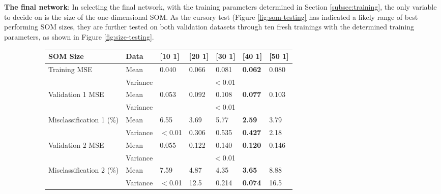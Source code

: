 \documentclass[10pt, oneside]{article}
\begin{document}
\textbf{The final network}: In selecting the final network, with the training parameters determined in Section \ref{subsec:training}, the only variable to decide on is the size of the one-dimensional SOM. As the cursory test (Figure \ref{fig:som-testing} has indicated a likely range of best performing SOM sizes, they are further tested on both validation datasets through ten fresh trainings with the determined training parameters, as shown in Figure \ref{fig:size-testing}.

\begin{figure}[h]
\begin{subfigure}{0.5\textwidth}
\fontsize{8}{10}\selectfont
\begin{tabular}{|p{2.0cm}|p{1.0cm}|p{0.7cm}|p{0.7cm}|p{0.7cm}|>{\bfseries}p{0.8cm}|p{0.7cm}|}
\hline 
SOM Size & Data & [10 1] & [20 1] & [30 1] & [40 1] & [50 1] \\ \hline
\multirow{2}{*}{\parbox{2.0cm}{\centering Training MSE}} & Mean & 0.040 & 0.066 & 0.081 & 0.062 & 0.080 \\ \cline{2-7}
\ & Variance & \multicolumn{5}{c|}{$<$0.01} \\ \hline
\multirow{2}{*}{\parbox{2.0cm}{\centering Validation 1 MSE}} & Mean & 0.053 & 0.092 & 0.108 & 0.077 & 0.103 \\ \cline{2-7}
\ & Variance & \multicolumn{5}{c|}{$<$0.01} \\ \hline
\multirow{2}{*}{\parbox{2.0cm}{\centering Misclassification 1 (\%)}} & Mean & 6.55 & 3.69 & 5.77 & 2.59 & 3.79 \\ \cline{2-7}
\ & Variance & $<$0.01 & 0.306 & 0.535 & 0.427 & 2.18 \\ \hline
\multirow{2}{*}{\parbox{2.0cm}{\centering Validation 2 MSE}} & Mean & 0.055 & 0.122 & 0.140 & 0.120 & 0.146 \\ \cline{2-7}
\ & Variance & \multicolumn{5}{c|}{$<$0.01} \\ \hline
\multirow{2}{*}{\parbox{2.0cm}{\centering Misclassification 2 (\%)}} & Mean & 7.59 & 4.87 & 4.35 & 3.65 & 8.88 \\ \cline{2-7}
\ & Variance & $<$0.01 & 12.5 & 0.214 & 0.074 & 16.5 \\ \hline
\end{tabular}
\end{subfigure}
\begin{subfigure}{0.5\textwidth}

\end{subfigure}
\end{figure}
\end{document}
